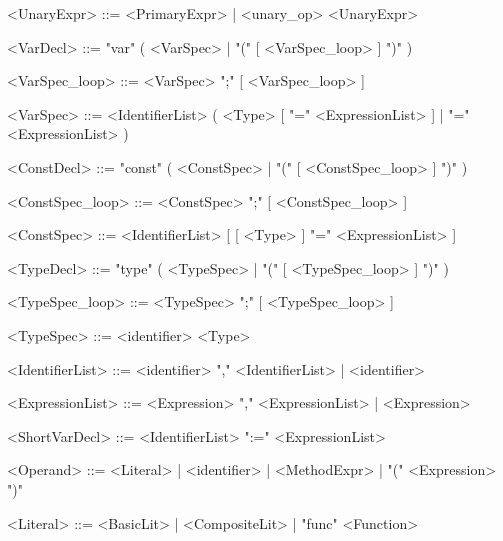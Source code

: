 \documentclass{article}
\begin{document}
\begin{grammar}
        <UnaryExpr>         ::=     <PrimaryExpr> | <unary_op> <UnaryExpr>


        <VarDecl>           ::=     "var" ( <VarSpec> | "(" [ <VarSpec_loop> ] ")" )

        <VarSpec_loop>      ::=     <VarSpec> ";" [ <VarSpec_loop> ]

        <VarSpec>           ::=     <IdentifierList> ( <Type> [ "=" <ExpressionList> ] | "=" <ExpressionList> )       

        <ConstDecl>         ::=     "const" ( <ConstSpec> | "(" [ <ConstSpec_loop> ] ")" )

        <ConstSpec_loop>    ::=     <ConstSpec> ";" [ <ConstSpec_loop> ]

        <ConstSpec>         ::=     <IdentifierList> [ [ <Type> ] "=" <ExpressionList> ]

        <TypeDecl>          ::=     "type" ( <TypeSpec> | "(" [ <TypeSpec_loop> ] ")" )

        <TypeSpec_loop>     ::=     <TypeSpec> ";" [ <TypeSpec_loop> ]

        <TypeSpec>          ::=     <identifier> <Type>

        <IdentifierList>    ::=     <identifier> "," <IdentifierList> | <identifier>

        <ExpressionList>    ::=     <Expression> "," <ExpressionList> | <Expression>

        <ShortVarDecl>      ::=     <IdentifierList> ":=" <ExpressionList>

        <Operand>           ::=     <Literal> | <identifier> | <MethodExpr> | "(" <Expression> ")"

        <Literal>           ::=     <BasicLit> | <CompositeLit> | "func" <Function>


\end{grammar}
\end{document}
